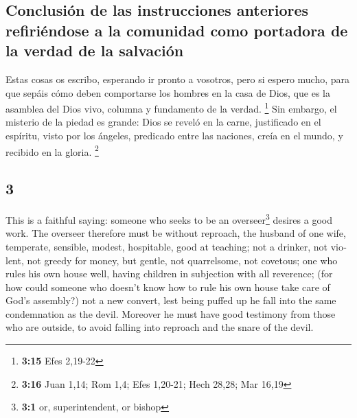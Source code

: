 \begin{paracol}{2}
\hypertarget{conclusiuxf3n-de-las-instrucciones-anteriores-refiriuxe9ndose-a-la-comunidad-como-portadora-de-la-verdad-de-la-salvaciuxf3n}{%
\subsection{Conclusión de las instrucciones anteriores refiriéndose a la
comunidad como portadora de la verdad de la
salvación}\label{conclusiuxf3n-de-las-instrucciones-anteriores-refiriuxe9ndose-a-la-comunidad-como-portadora-de-la-verdad-de-la-salvaciuxf3n}}

 Estas cosas os escribo, esperando ir pronto a vosotros,
 pero si espero mucho, para que sepáis cómo deben
comportarse los hombres en la casa de Dios, que es la asamblea del Dios
vivo, columna y fundamento de la verdad. \footnote{\textbf{3:15} Efes
  2,19-22}  Sin embargo, el misterio de la piedad es
grande: Dios se reveló en la carne, justificado en el espíritu, visto
por los ángeles, predicado entre las naciones, creía en el mundo, y
recibido en la gloria. \footnote{\textbf{3:16} Juan 1,14; Rom 1,4; Efes
  1,20-21; Hech 28,28; Mar 16,19}

\switchcolumn
\begin{otherlanguage}{english}

\hypertarget{section-5}{%
\section{3}\label{section-5}}

 This is a faithful saying: someone who seeks to be an
overseer\footnote{\textbf{3:1} or, superintendent, or bishop} desires a
good work.  The overseer therefore must be without
reproach, the husband of one wife, temperate, sensible, modest,
hospitable, good at teaching;  not a drinker, not violent,
not greedy for money, but gentle, not quarrelsome, not covetous;
 one who rules his own house well, having children in
subjection with all reverence;  (for how could someone who
doesn't know how to rule his own house take care of God's assembly?)
 not a new convert, lest being puffed up he fall into the
same condemnation as the devil.  Moreover he must have
good testimony from those who are outside, to avoid falling into
reproach and the snare of the devil.


\end{otherlanguage}
\end{paracol}
